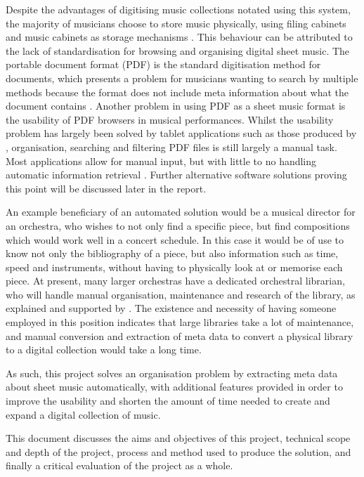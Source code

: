 Despite the advantages of digitising music collections notated using this system, the majority of musicians choose to store music physically, using filing cabinets and music cabinets as storage mechanisms \parencite{musicOrganising}. This behaviour can be attributed to the lack of standardisation for browsing and organising digital sheet music. The portable document format (PDF) is the standard digitisation method for documents, which presents a problem for musicians wanting to search by multiple methods because the format does not include meta information about what the document contains \parencite{MusicXMLPresentation}. Another problem in using PDF as a sheet music format is the usability of PDF browsers in musical performances. Whilst the usability problem has largely been solved by tablet applications such as those produced by \cite{forScore}, organisation, searching and filtering PDF files is still largely a manual task. Most applications allow for manual input, but with little to no handling automatic information retrieval \parencite{musicReader}. Further alternative software solutions proving this point will be discussed later in the report.

An example beneficiary of an automated solution would be a musical director for an orchestra, who wishes to not only find a specific piece, but find compositions which would work well in a concert schedule. In this case it would be of use to know not only the bibliography of a piece, but also information such as time, speed and instruments, without having to physically look at or memorise each piece. At present, many larger orchestras have a dedicated orchestral librarian, who will handle manual organisation, maintenance and research of the library, as explained and supported by \cite{MusicLibrarian}. The existence and necessity of having someone employed in this position indicates that large libraries take a lot of maintenance, and manual conversion and extraction of meta data to convert a physical library to a digital collection would take a long time.

As such, this project solves an organisation problem by extracting meta data about sheet music automatically, with additional features provided in order to improve the usability and shorten the amount of time needed to create and expand a digital collection of music.

This document discusses the aims and objectives of this project, technical scope and depth of the project, process and method used to produce the solution, and finally a critical evaluation of the project as a whole.
\pagebreak

